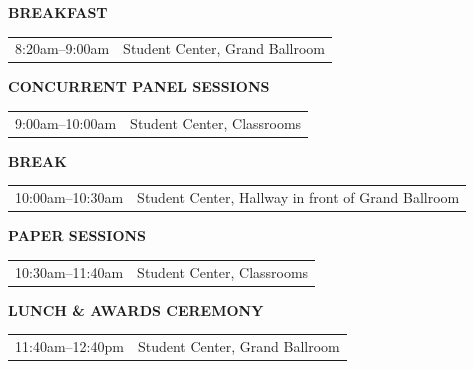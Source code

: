 \documentclass[
  10pt,
  letterpaper,
  DIV=11,
  numbers=noendperiod]{scrartcl}
\begin{document}
{\renewcommand{\arraystretch}{0.9}

\noindent\textcolor{event}{\textbf{BREAKFAST}}

\begin{tabular}{@{}p{3.2cm}p{\dimexpr\linewidth-3.5cm}@{}}
  8:20am--9:00am & Student Center, Grand Ballroom \\
\end{tabular}

\vspace{0.25em}

\noindent\textcolor{event}{\textbf{CONCURRENT PANEL SESSIONS}}

\begin{tabular}{@{}p{3.2cm}p{\dimexpr\linewidth-3.5cm}@{}}
  9:00am--10:00am & Student Center, Classrooms \\
\end{tabular}

\vspace{0.25em}

\noindent\textcolor{event}{\textbf{BREAK}}

\begin{tabular}{@{}p{3.2cm}p{\dimexpr\linewidth-3.5cm}@{}}
  10:00am--10:30am & Student Center, Hallway in front of Grand Ballroom \\
\end{tabular}

\vspace{0.25em}

\noindent\textcolor{event}{\textbf{PAPER SESSIONS}}

\begin{tabular}{@{}p{3.2cm}p{\dimexpr\linewidth-3.5cm}@{}}
  10:30am--11:40am & Student Center, Classrooms \\
\end{tabular}

\vspace{0.25em}

\noindent\textcolor{event}{\textbf{LUNCH \& AWARDS CEREMONY}}

\begin{tabular}{@{}p{3.2cm}p{\dimexpr\linewidth-3.5cm}@{}}
  11:40am--12:40pm & Student Center, Grand Ballroom \\
\end{tabular}

\vspace{0.25em}

}
\newpage

\end{document}
